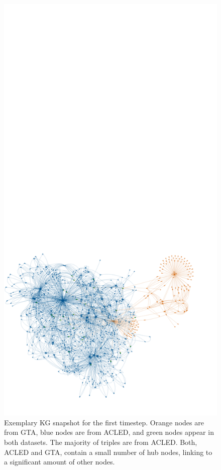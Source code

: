 \begin{figure}
    \centering
    \includegraphics[clip, trim=0cm 3cm 0cm 42cm, width=1\textwidth]{figs/snap1_newcolors_horizon.png} %
    \caption{Exemplary KG snapshot for the first timestep. Orange nodes are from GTA, blue nodes are from ACLED, and green nodes appear in both datasets. The majority of triples are from ACLED. Both, ACLED and GTA, contain a small number of hub nodes, linking to a significant amount of other nodes.}
    \label{fig:kg_static}
\end{figure}
